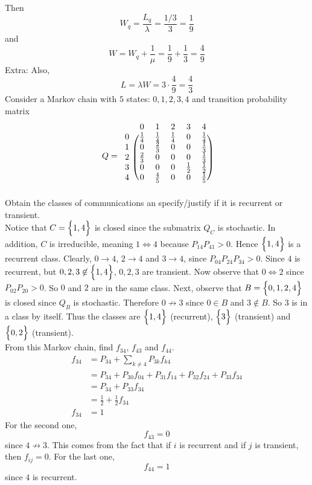 \documentclass[12pt]{article}
\begin{document}
Then $$W_q = \frac{L_q}{\lambda} = \frac{1/3}{3} = \frac{1}{9} $$ 
and $$ W = W_q + \frac{1}{\mu} = \frac{1}{9} + \frac{1}{3} = \frac{4}{9} $$ 
Extra: Also, $$ L = \lambda W = 3 \cdot \frac{4}{9} = \frac{4}{3}$$ 
Consider a Markov chain with $5$ states: $0,1,2,3,4$ and transition probability matrix $$ Q = \begin{blockarray}{cccccc}
&0&1&2&3&4 \\
\begin{block}{c(ccccc)}
0 & \frac{1}{4} & \frac{1}{4} & \frac{1}{4} & 0 & \frac{1}{4} \\
1 & 0 & \frac{2}{3} & 0 & 0 & \frac{1}{3}  \\ 
2 & \frac{2}{3} & 0 & 0 & 0 & \frac{1}{3}   \\
3 & 0 & 0 & 0 & \frac{1}{2} & \frac{1}{2} \\ 
4 & 0 & \frac{4}{5} & 0 & 0 & \frac{1}{5} \\ \end{block} \end{blockarray} $$
Obtain the classes of communications an specify/justify if it is recurrent or transient.
\\ 
Notice that $C = \Big\{ 1,4 \Big\}$ is closed since the submatrix $Q_C$ is stochastic. In addition, $C$ is irreducible, meaning $1 \iff 4$ because $P_{14}P_{41} > 0$. Hence $\Big\{ 1,4 \Big\}$ is a recurrent class. Clearly, $0 \to 4$, $2\to4$ and $3\to4$, since $P_{04}P_{24}P_{34} > 0$. Since $4$ is recurrent, but $0,2,3 \not\in \Big\{ 1,4 \Big\}$, $0,2,3$ are transient. Now observe that $0\iff 2$ since $P_{02}P_{20} > 0$. So $0$ and $2$ are in the same class. Next, observe that $B = \Big\{ 0,1,2,4 \Big\}$ is closed since $Q_B$ is stochastic. Therefore $0\not\to3$ since $0\in B$ and $3 \not\in B$. So $3$ is in a class by itself. Thus the classes are $\Big\{ 1,4 \Big\}$ (recurrent), $\Big\{ 3 \Big\}$ (transient) and $\Big\{ 0,2 \Big\}$ (transient). \\
From this Markov chain, find $f_{34}$, $f_{43}$ and $f_{44}$. 
$$ \begin{aligned} f_{34} &= P_{34} + \sum_{k\neq 4} P_{3k}f_{k4} \\ &= P_{34} + P_{30}f_{04} + P_{31}f_{14} + P_{32}f_{24} + P_{33}f_{34} \\ &= P_{34} + P_{33}f_{34} \\ &= \frac{1}{2} + \frac{1}{2}f_{34} \\ f_{34} &= 1 \end{aligned} $$ 
For the second one, $$f_{43} = 0$$ since $4\not\to 3$. This comes from the fact that if $i$ is recurrent and if $j$ is transient, then $f_{ij} = 0$. For the last one, $$ f_{44} = 1$$ since $4$ is recurrent. \\
\end{document}
